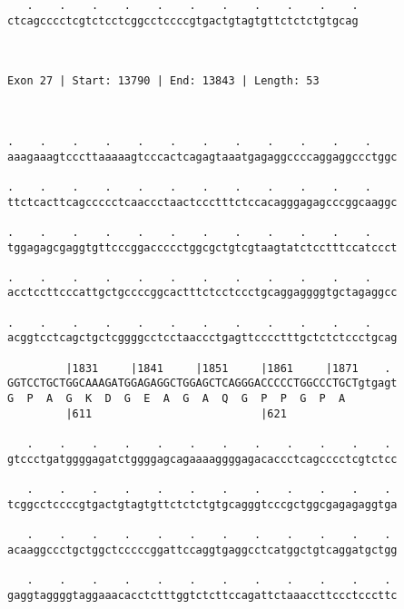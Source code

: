 \documentclass{article}
\begin{document}
\begin{Verbatim}
   .    .    .    .    .    .    .    .    .    .    .
ctcagcccctcgtctcctcggcctccccgtgactgtagtgttctctctgtgcag
                                                      
                                                      
 
Exon 27 | Start: 13790 | End: 13843 | Length: 53



.    .    .    .    .    .    .    .    .    .    .    .    
aaagaaagtcccttaaaaagtcccactcagagtaaatgagaggccccaggaggccctggc
                                                            
.    .    .    .    .    .    .    .    .    .    .    .    
ttctcacttcagccccctcaaccctaactccctttctccacagggagagcccggcaaggc
                                                            
.    .    .    .    .    .    .    .    .    .    .    .    
tggagagcgaggtgttcccggaccccctggcgctgtcgtaagtatctcctttccatccct
                                                            
.    .    .    .    .    .    .    .    .    .    .    .    
acctccttcccattgctgccccggcactttctcctccctgcaggaggggtgctagaggcc
                                                            
.    .    .    .    .    .    .    .    .    .    .    .    
acggtcctcagctgctcggggcctcctaaccctgagttcccctttgctctctccctgcag
                                                            
         |1831     |1841     |1851     |1861     |1871    . 
GGTCCTGCTGGCAAAGATGGAGAGGCTGGAGCTCAGGGACCCCCTGGCCCTGCTgtgagt
G  P  A  G  K  D  G  E  A  G  A  Q  G  P  P  G  P  A        
         |611                          |621                 
  
   .    .    .    .    .    .    .    .    .    .    .    . 
gtccctgatggggagatctggggagcagaaaaggggagacaccctcagcccctcgtctcc
                                                            
   .    .    .    .    .    .    .    .    .    .    .    . 
tcggcctccccgtgactgtagtgttctctctgtgcagggtcccgctggcgagagaggtga
                                                            
   .    .    .    .    .    .    .    .    .    .    .    . 
acaaggccctgctggctcccccggattccaggtgaggcctcatggctgtcaggatgctgg
                                                            
   .    .    .    .    .    .    .    .    .    .    .    . 
gaggtaggggtaggaaacacctctttggtctcttccagattctaaaccttccctcccttc
                                                            

\end{Verbatim}
\end{document}
